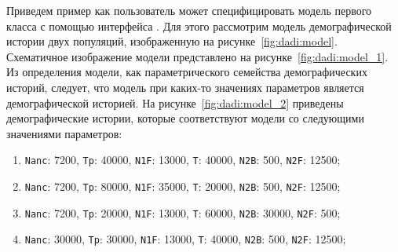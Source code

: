 \documentclass[a4paper,14pt,oneside,openany,article]{memoir}
\begin{document}
Приведем пример как пользователь может специфицировать модель первого класса с помощью интерфейса \dadi.
Для этого рассмотрим модель демографической истории двух популяций, изображенную на рисунке~\ref{fig:dadi:model}.
Схематичное изображение модели представлено на рисунке~\ref{fig:dadi:model_1}.
Из определения модели, как параметрического семейства демографических историй, следует, что модель при каких-то значениях параметров является демографической историей.
На рисунке~\ref{fig:dadi:model_2} приведены демографические истории, которые соответствуют модели со следующими значениями параметров:
\begin{enumerate}[label={\arabic*}.]
    \item \texttt{Nanc}: 7200, \texttt{Tp}: 40000, \texttt{N1F}: 13000, \texttt{T}: 40000, \texttt{N2B}: 500, \texttt{N2F}: 12500;
    \item \texttt{Nanc}: 7200, \texttt{Tp}: 80000, \texttt{N1F}: 35000, \texttt{T}: 20000, \texttt{N2B}: 500, \texttt{N2F}: 12500;
    \item \texttt{Nanc}: 7200, \texttt{Tp}: 20000, \texttt{N1F}: 13000, \texttt{T}: 60000, \texttt{N2B}: 30000, \texttt{N2F}: 500;
    \item \texttt{Nanc}: 30000, \texttt{Tp}: 30000, \texttt{N1F}: 13000, \texttt{T}: 40000, \texttt{N2B}: 500, \texttt{N2F}: 12500;
\end{enumerate}
\end{document}
